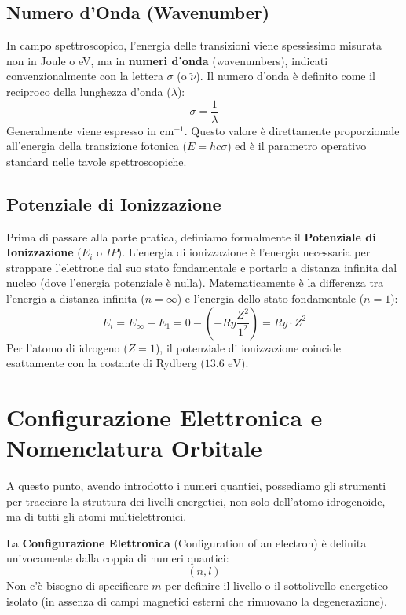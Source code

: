 \subsection{Numero d'Onda (Wavenumber)}

In campo spettroscopico, l'energia delle transizioni viene spessissimo misurata non in Joule o eV, ma in \textbf{numeri d'onda} (wavenumbers), indicati convenzionalmente con la lettera $\sigma$ (o $\tilde{\nu}$).
Il numero d'onda è definito come il reciproco della lunghezza d'onda ($\lambda$):
\begin{equation}
\sigma = \frac{1}{\lambda}
\end{equation}
Generalmente viene espresso in $\text{cm}^{-1}$. Questo valore è direttamente proporzionale all'energia della transizione fotonica ($E = hc\sigma$) ed è il parametro operativo standard nelle tavole spettroscopiche.

\subsection{Potenziale di Ionizzazione}

Prima di passare alla parte pratica, definiamo formalmente il \textbf{Potenziale di Ionizzazione} ($E_i$ o $IP$).
L'energia di ionizzazione è l'energia necessaria per strappare l'elettrone dal suo stato fondamentale e portarlo a distanza infinita dal nucleo (dove l'energia potenziale è nulla).
Matematicamente è la differenza tra l'energia a distanza infinita ($n = \infty$) e l'energia dello stato fondamentale ($n = 1$):
\begin{equation}
E_i = E_{\infty} - E_1 = 0 - \left( - Ry \frac{Z^2}{1^2} \right) = Ry \cdot Z^2
\end{equation}
Per l'atomo di idrogeno ($Z=1$), il potenziale di ionizzazione coincide esattamente con la costante di Rydberg ($13.6 \text{ eV}$).

\section{Configurazione Elettronica e Nomenclatura Orbitale}

A questo punto, avendo introdotto i numeri quantici, possediamo gli strumenti per tracciare la struttura dei livelli energetici, non solo dell'atomo idrogenoide, ma di tutti gli atomi multielettronici.

La \textbf{Configurazione Elettronica} (Configuration of an electron) è definita univocamente dalla coppia di numeri quantici:
\begin{equation}
(n, l)
\end{equation}
Non c'è bisogno di specificare $m$ per definire il livello o il sottolivello energetico isolato (in assenza di campi magnetici esterni che rimuovano la degenerazione).

